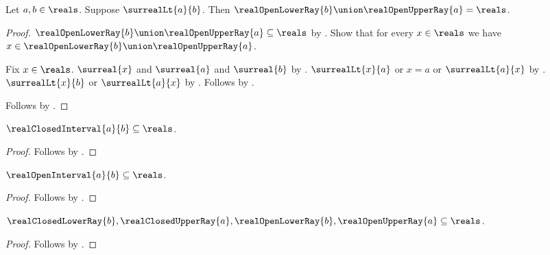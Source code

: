 \begin{theorem}\label{real_open_rays_cover}
    Let $a,b\in\reals$.
    Suppose $\surrealLt{a}{b}$.
    Then $\realOpenLowerRay{b}\union\realOpenUpperRay{a}=\reals$.
\end{theorem}
\begin{proof}
    $\realOpenLowerRay{b}\union\realOpenUpperRay{a}\subseteq\reals$ by
        .
    Show that for every $x\in\reals$ we have
        $x\in\realOpenLowerRay{b}\union\realOpenUpperRay{a}$.
    \begin{subproof}
        Fix $x\in\reals$.
        $\surreal{x}$ and $\surreal{a}$ and $\surreal{b}$ by
            .
        $\surrealLt{x}{a}$ or $x=a$ or $\surrealLt{a}{x}$ by
            .
        $\surrealLt{x}{b}$ or $\surrealLt{a}{x}$ by .
        Follows by .
    \end{subproof}
    Follows by .
\end{proof}

\begin{proposition}\label{real_closed_interval_subset_reals}
    $\realClosedInterval{a}{b}\subseteq\reals$.
\end{proposition}
\begin{proof}
    Follows by .
\end{proof}

\begin{proposition}\label{real_open_interval_subset_reals}
    $\realOpenInterval{a}{b}\subseteq\reals$.
\end{proposition}
\begin{proof}
    Follows by .
\end{proof}

\begin{proposition}\label{real_ray_subsets_reals}
    $\realClosedLowerRay{b},\realClosedUpperRay{a},
        \realOpenLowerRay{b},\realOpenUpperRay{a}\subseteq\reals$.
\end{proposition}
\begin{proof}
    Follows by
        .
\end{proof}

